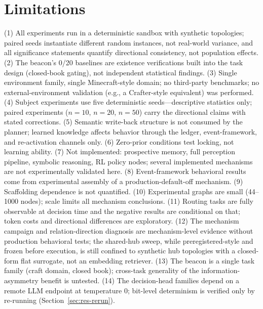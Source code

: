 \documentclass[10pt,a4paper]{article}
\begin{document}
\section{Limitations}
\label{sec:limits}
(1) All experiments run in a deterministic sandbox with synthetic topologies; paired seeds instantiate different random instances, not real-world variance, and all significance statements quantify directional consistency, not population effects. (2) The beacon's 0/20 baselines are existence verifications built into the task design (closed-book gating), not independent statistical findings. (3) Single environment family, single Minecraft-style domain; no third-party benchmarks; no external-environment validation (e.g., a Crafter-style equivalent) was performed. (4) Subject experiments use five deterministic seeds---descriptive statistics only; paired experiments ($n{=}10$, $n{=}20$, $n{=}50$) carry the directional claims with stated corrections. (5) Semantic write-back structure is not consumed by the planner; learned knowledge affects behavior through the ledger, event-framework, and re-activation channels only. (6) Zero-prior conditions test locking, not learning ability. (7) Not implemented: prospective memory, full perception pipeline, symbolic reasoning, RL policy nodes; several implemented mechanisms are not experimentally validated here. (8) Event-framework behavioral results come from experimental assembly of a production-default-off mechanism. (9) Scaffolding dependence is not quantified. (10) Experimental graphs are small (44--1000 nodes); scale limits all mechanism conclusions. (11) Routing tasks are fully observable at decision time and the negative results are conditional on that; token costs and directional differences are exploratory. (12) The mechanism campaign and relation-direction diagnosis are mechanism-level evidence without production behavioral tests; the shared-hub sweep, while preregistered-style and frozen before execution, is still confined to synthetic hub topologies with a closed-form flat surrogate, not an embedding retriever. (13) The beacon is a single task family (craft domain, closed book); cross-task generality of the information-asymmetry benefit is untested. (14) The decision-head families depend on a remote LLM endpoint at temperature 0; bit-level determinism is verified only by re-running (Section~\ref{sec:res-rerun}).
\end{document}
